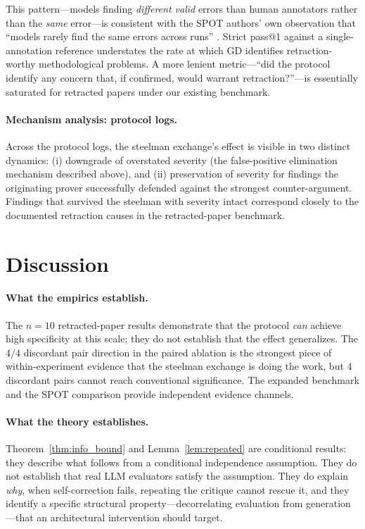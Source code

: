 \documentclass[11pt]{article}
\theoremstyle{definition}
\begin{document}
This pattern---models finding \emph{different valid} errors than human annotators rather than the \emph{same} error---is consistent with the SPOT authors' own observation that ``models rarely find the same errors across runs'' \citep{son2025spot}. Strict pass@1 against a single-annotation reference understates the rate at which GD identifies retraction-worthy methodological problems. A more lenient metric---``did the protocol identify any concern that, if confirmed, would warrant retraction?''---is essentially saturated for retracted papers under our existing benchmark.

\paragraph{Mechanism analysis: protocol logs.} Across the protocol logs, the steelman exchange's effect is visible in two distinct dynamics: (i) downgrade of overstated severity (the false-positive elimination mechanism described above), and (ii) preservation of severity for findings the originating prover successfully defended against the strongest counter-argument. Findings that survived the steelman with severity intact correspond closely to the documented retraction causes in the retracted-paper benchmark.

\section{Discussion}
\label{sec:discussion}

\paragraph{What the empirics establish.} The $n = 10$ retracted-paper results demonstrate that the protocol \emph{can} achieve high specificity at this scale; they do not establish that the effect generalizes. The $4/4$ discordant pair direction in the paired ablation is the strongest piece of within-experiment evidence that the steelman exchange is doing the work, but $4$ discordant pairs cannot reach conventional significance. The expanded benchmark and the SPOT comparison provide independent evidence channels.

\paragraph{What the theory establishes.} Theorem~\ref{thm:info_bound} and Lemma~\ref{lem:repeated} are conditional results: they describe what follows from a conditional independence assumption. They do not establish that real LLM evaluators satisfy the assumption. They do explain \emph{why}, when self-correction fails, repeating the critique cannot rescue it, and they identify a specific structural property---decorrelating evaluation from generation---that an architectural intervention should target.
\end{document}
